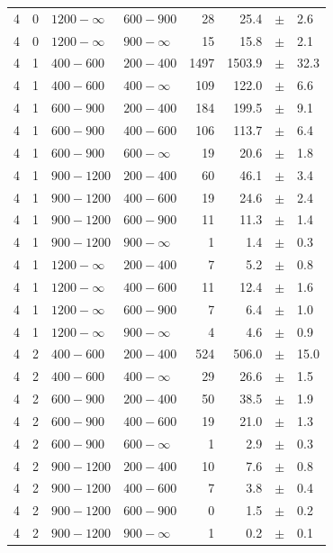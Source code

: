 \begin{table}[!h]
\begin{tabular}{rrllrrcl}
4 & 0 & $1200- \infty$ & $600-900$ &     28 &     25.4 &$\pm$&    2.6 \\
4 & 0 & $1200- \infty$ & $900-\infty$ &     15 &     15.8 &$\pm$&    2.1 \\
4\T & 1 & $ 400- 600$ & $200-400$ &   1497 &   1503.9 &$\pm$&   32.3 \\
4 & 1 & $ 400- 600$ & $400-\infty$ &    109 &    122.0 &$\pm$&    6.6 \\
4\T & 1 & $ 600- 900$ & $200-400$ &    184 &    199.5 &$\pm$&    9.1 \\
4 & 1 & $ 600- 900$ & $400-600$ &    106 &    113.7 &$\pm$&    6.4 \\
4 & 1 & $ 600- 900$ & $600-\infty$ &     19 &     20.6 &$\pm$&    1.8 \\
4\T & 1 & $ 900-1200$ & $200-400$ &     60 &     46.1 &$\pm$&    3.4 \\
4 & 1 & $ 900-1200$ & $400-600$ &     19 &     24.6 &$\pm$&    2.4 \\
4 & 1 & $ 900-1200$ & $600-900$ &     11 &     11.3 &$\pm$&    1.4 \\
4 & 1 & $ 900-1200$ & $900-\infty$ &      1 &      1.4 &$\pm$&    0.3 \\
4\T & 1 & $1200- \infty$ & $200-400$ &      7 &      5.2 &$\pm$&    0.8 \\
4 & 1 & $1200- \infty$ & $400-600$ &     11 &     12.4 &$\pm$&    1.6 \\
4 & 1 & $1200- \infty$ & $600-900$ &      7 &      6.4 &$\pm$&    1.0 \\
4 & 1 & $1200- \infty$ & $900-\infty$ &      4 &      4.6 &$\pm$&    0.9 \\
4\T & 2 & $ 400- 600$ & $200-400$ &    524 &    506.0 &$\pm$&   15.0 \\
4 & 2 & $ 400- 600$ & $400-\infty$ &     29 &     26.6 &$\pm$&    1.5 \\
4\T & 2 & $ 600- 900$ & $200-400$ &     50 &     38.5 &$\pm$&    1.9 \\
4 & 2 & $ 600- 900$ & $400-600$ &     19 &     21.0 &$\pm$&    1.3 \\
4 & 2 & $ 600- 900$ & $600-\infty$ &      1 &      2.9 &$\pm$&    0.3 \\
4\T & 2 & $ 900-1200$ & $200-400$ &     10 &      7.6 &$\pm$&    0.8 \\
4 & 2 & $ 900-1200$ & $400-600$ &      7 &      3.8 &$\pm$&    0.4 \\
4 & 2 & $ 900-1200$ & $600-900$ &      0 &      1.5 &$\pm$&    0.2 \\
4 & 2 & $ 900-1200$ & $900-\infty$ &      1 &      0.2 &$\pm$&    0.1 \\

\end{tabular}
\end{table}
